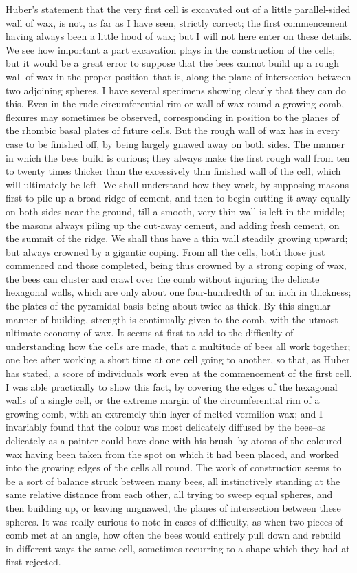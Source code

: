 Huber's statement that the very first cell is excavated out of a little parallel-sided wall of wax, is not, as far as I have seen, strictly correct; the first commencement having always been a little hood of wax; but I will not here enter on these details. We see how important a part excavation plays in the construction of the cells; but it would be a great error to suppose that the bees cannot build up a rough wall of wax in the proper position--that is, along the plane of intersection between two adjoining spheres. I have several specimens showing clearly that they can do this. Even in the rude circumferential rim or wall of wax round a growing comb, flexures may sometimes be observed, corresponding in position to the planes of the rhombic basal plates of future cells. But the rough wall of wax has in every case to be finished off, by being largely gnawed away on both sides. The manner in which the bees build is curious; they always make the first rough wall from ten to twenty times thicker than the excessively thin finished wall of the cell, which will ultimately be left. We shall understand how they work, by supposing masons first to pile up a broad ridge of cement, and then to begin cutting it away equally on both sides near the ground, till a smooth, very thin wall is left in the middle; the masons always piling up the cut-away cement, and adding fresh cement, on the summit of the ridge. We shall thus have a thin wall steadily growing upward; but always crowned by a gigantic coping. From all the cells, both those just commenced and those completed, being thus crowned by a strong coping of wax, the bees can cluster and crawl over the comb without injuring the delicate hexagonal walls, which are only about one four-hundredth of an inch in thickness; the plates of the pyramidal basis being about twice as thick. By this singular manner of building, strength is continually given to the comb, with the utmost ultimate economy of wax.
It seems at first to add to the difficulty of understanding how the cells are made, that a multitude of bees all work together; one bee after working a short time at one cell going to another, so that, as Huber has stated, a score of individuals work even at the commencement of the first cell. I was able practically to show this fact, by covering the edges of the hexagonal walls of a single cell, or the extreme margin of the circumferential rim of a growing comb, with an extremely thin layer of melted vermilion wax; and I invariably found that the colour was most delicately diffused by the bees--as delicately as a painter could have done with his brush--by atoms of the coloured wax having been taken from the spot on which it had been placed, and worked into the growing edges of the cells all round. The work of construction seems to be a sort of balance struck between many bees, all instinctively standing at the same relative distance from each other, all trying to sweep equal spheres, and then building up, or leaving ungnawed, the planes of intersection between these spheres. It was really curious to note in cases of difficulty, as when two pieces of comb met at an angle, how often the bees would entirely pull down and rebuild in different ways the same cell, sometimes recurring to a shape which they had at first rejected.
